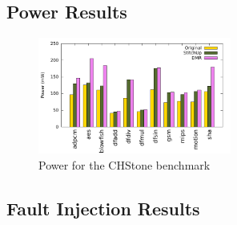 \subsection{Power Results}

\begin{figure}[h]
\centering
\includegraphics[width=2.5in]{./graphs/chstone_absolute_power_24_09_2015.pdf}
\caption{Power for the CHStone benchmark}
\label{fig:power_result}
\end{figure}

\subsection{Fault Injection Results}
